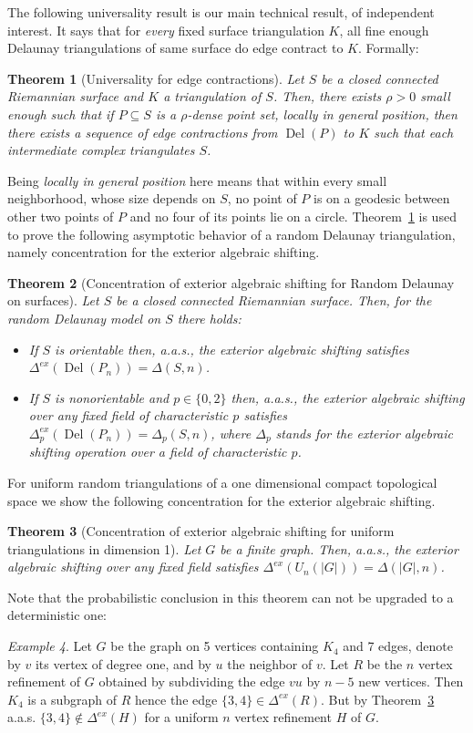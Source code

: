 \documentclass[reqno,english]{amsart}
\newtheorem{theorem}{Theorem}
\numberwithin{claimcounter}{theorem}
\theoremstyle{remark}
\newtheorem{example}[theorem]{Example}
\theoremstyle{definition}
\numberwithin{theorem}{section}
\DeclareMathOperator{\Del}{Del}
\newcommand{\exshift}[1]{\Delta^{ex}(#1)}
\begin{document}
The following universality result is our main technical result, of independent interest. It says that for \emph{every} fixed surface triangulation $K$, all fine enough Delaunay triangulations of same surface do edge contract to $K$. Formally:
\begin{theorem}[Universality for edge contractions]
    \label{t:delaunayref}
    Let $S$ be a closed connected Riemannian surface and $K$ a triangulation of $S$. Then, there exists $\rho>0$ small enough such that if $P\subseteq S$ is a $\rho$-dense point set, locally in general position, then there exists a sequence of edge contractions from $\Del(P)$ to $K$ such that each intermediate complex triangulates $S$.
\end{theorem}
Being \emph{locally in general position} here means that within every small neighborhood, whose size depends on $S$, no point of $P$ is on a geodesic between other two points of $P$ and no four of its points lie on a circle.
Theorem~\ref{t:delaunayref} is used to prove the following asymptotic behavior of a random Delaunay triangulation, namely concentration for the exterior algebraic shifting.
\begin{theorem}[Concentration of exterior algebraic shifting for Random Delaunay on surfaces]\label{t:aasDelauney}
Let $S$ be a closed connected Riemannian surface. Then, for the random Delaunay model on $S$ there holds:
\begin{itemize}
    \item If $S$ is orientable then, a.a.s., the exterior algebraic shifting satisfies
$\Delta^{ex}(\Del(P_n))
    =\Delta(S,n)
    $.
    \item If $S$ is nonorientable and $p\in \{0,2\}$ then, a.a.s., 
the exterior algebraic shifting over any fixed field of characteristic $p$ satisfies $\Delta^{ex}_p(\Del(P_n)) 
    =\Delta_p(S,n)$,
    where $\Delta_p$ stands for the exterior algebraic shifting operation over a field of characteristic $p$.
\end{itemize}


\end{theorem}
For uniform random triangulations of a one dimensional compact topological space we show the following concentration for the exterior algebraic shifting.
\begin{theorem}[Concentration of exterior algebraic shifting for uniform triangulations in dimension 1]\label{t:aasUniform1-dim}
   Let $G$ be a finite graph. Then, a.a.s., the exterior algebraic shifting over any fixed field satisfies $\exshift {U_n(|G|)}
   = \Delta(|G|,n)$.
\end{theorem}
Note that the probabilistic conclusion in this theorem can not be upgraded to a deterministic one:
\begin{example}\label{ex:graph}
Let $G$ be the graph on 5 vertices containing $K_4$ and 7 edges, denote by $v$ its vertex of degree one, and by $u$ the neighbor of $v$. Let $R$ be the $n$ vertex refinement of $G$ obtained by subdividing the edge $vu$ by $n-5$ new vertices. Then $K_4$ is a subgraph of $R$ hence the edge $\{3,4\}\in \exshift R$. But by Theorem~\ref{t:aasUniform1-dim}  a.a.s. $\{3,4\}\notin \exshift H$ for a uniform $n$ vertex refinement $H$ of $G$.
\end{example}
\end{document}
